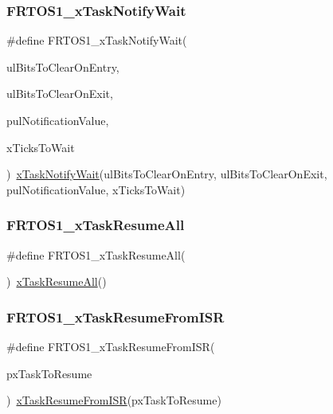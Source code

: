 \subsubsection{\texorpdfstring{F\+R\+T\+O\+S1\+\_\+x\+Task\+Notify\+Wait}{FRTOS1\_xTaskNotifyWait}}
{\footnotesize\ttfamily \#define F\+R\+T\+O\+S1\+\_\+x\+Task\+Notify\+Wait(\begin{DoxyParamCaption}\item[{}]{ul\+Bits\+To\+Clear\+On\+Entry,  }\item[{}]{ul\+Bits\+To\+Clear\+On\+Exit,  }\item[{}]{pul\+Notification\+Value,  }\item[{}]{x\+Ticks\+To\+Wait }\end{DoxyParamCaption})~\hyperlink{tasks_8c_a7cab914767933dc732f2c36e3915f6b0}{x\+Task\+Notify\+Wait}(ul\+Bits\+To\+Clear\+On\+Entry, ul\+Bits\+To\+Clear\+On\+Exit, pul\+Notification\+Value, x\+Ticks\+To\+Wait)}

\mbox{\label{group___f_r_t_o_s1__module_ga0b808ab2b4a42ef92dc5b7df25094b13}} 
\subsubsection{\texorpdfstring{F\+R\+T\+O\+S1\+\_\+x\+Task\+Resume\+All}{FRTOS1\_xTaskResumeAll}}
{\footnotesize\ttfamily \#define F\+R\+T\+O\+S1\+\_\+x\+Task\+Resume\+All(\begin{DoxyParamCaption}{ }\end{DoxyParamCaption})~\hyperlink{tasks_8c_adf830ea0f150fcdfdaa944667137f080}{x\+Task\+Resume\+All}()}

\mbox{\label{group___f_r_t_o_s1__module_ga93f84683e0388ccd7a44fc1e9117116e}} 
\subsubsection{\texorpdfstring{F\+R\+T\+O\+S1\+\_\+x\+Task\+Resume\+From\+I\+SR}{FRTOS1\_xTaskResumeFromISR}}
{\footnotesize\ttfamily \#define F\+R\+T\+O\+S1\+\_\+x\+Task\+Resume\+From\+I\+SR(\begin{DoxyParamCaption}\item[{}]{px\+Task\+To\+Resume }\end{DoxyParamCaption})~\hyperlink{tasks_8c_a17fb13e7325d9dee9dec76f4a736138b}{x\+Task\+Resume\+From\+I\+SR}(px\+Task\+To\+Resume)}

